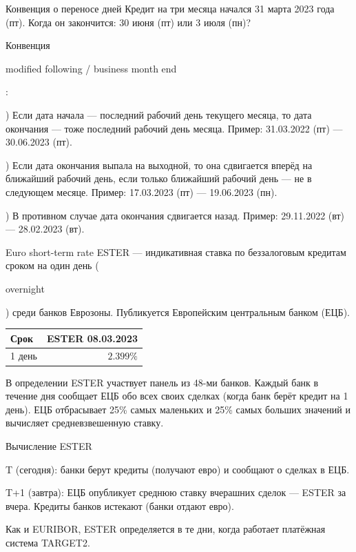 \documentclass{beamer}
\newcommand{\en}[1]{\begin{otherlanguage}{english}#1\end{otherlanguage}}
\begin{document}
\begin{frame}{Конвенция о переносе дней}
\justify
Кредит на три месяца начался 31 марта 2023 года (пт). Когда он закончится: 30 июня (пт) или 3 июля (пн)?

\justify
Конвенция \en{modified following / business month end}:

) Если дата начала --- последний рабочий день текущего месяца, то дата окончания --- тоже последний рабочий день месяца. Пример: 31.03.2022 (пт) --- 30.06.2023 (пт).

) Если дата окончания выпала на выходной, то она сдвигается вперёд на ближайший 
рабочий день, если только ближайший рабочий день --- не в следующем месяце. Пример: 
17.03.2023 (пт) --- 19.06.2023 (пн).

) В противном случае дата окончания сдвигается назад. Пример: 29.11.2022 (вт) --- 28.02.2023 (вт).
\end{frame}



\begin{frame}{Euro short-term rate}
\justify
\alert{ESTER} --- индикативная ставка по беззалоговым кредитам сроком на один день (\en{overnight}) среди банков Еврозоны. Публикуется Европейским центральным банком (ЕЦБ).

\justify
\centering
\begin{tabular}{l|r}
Срок   & ESTER 08.03.2023 \\ \hline
1 день & $2.399\%$
\end{tabular}

\justify
В определении ESTER участвует панель из 48-ми банков. Каждый банк в течение дня сообщает ЕЦБ обо всех своих сделках (когда банк берёт кредит на 1 день). ЕЦБ отбрасывает 25\% самых маленьких и 25\% самых больших значений и вычисляет средневзвешенную ставку.
\end{frame}



\begin{frame}{Вычисление ESTER}
\justify
\centering
{}

\justify
T (сегодня): банки берут кредиты (получают евро) и сообщают о сделках в ЕЦБ.

T+1 (завтра): ЕЦБ опубликует среднюю ставку вчерашних сделок --- ESTER за вчера. Кредиты банков истекают (банки отдают евро).

\justify
Как и EURIBOR, ESTER определяется в те дни, когда работает платёжная система TARGET2.
\end{frame}
\end{document}
